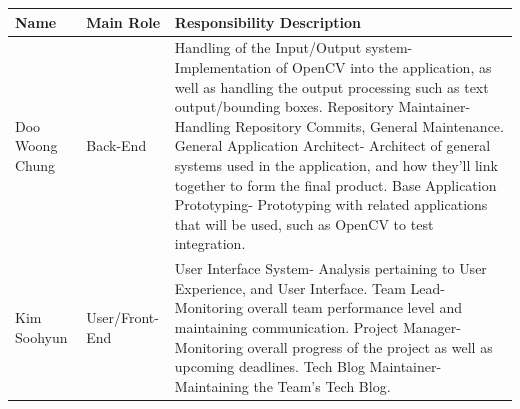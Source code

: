 \documentclass[conference]{IEEEtran}
\begin{document}
\begin{table}[htbp]
\begin{tabular}{|p{1.5cm}|p{1.5cm}|p{4.7cm}|}
\hline
\textbf{Name} & \textbf{Main Role} & \textbf{Responsibility Description}\\ \hline
Doo Woong Chung & Back-End & 
\newline Handling of the Input/Output system\newline- Implementation of OpenCV into the application, as well as handling the output processing such as text output/bounding boxes.
\newline 
\newline Repository Maintainer\newline- Handling Repository Commits, General Maintenance.
\newline 
\newline General Application Architect\newline- Architect of general systems used in the application, and how they'll link together to form the final product. 
\newline 
\newline Base Application Prototyping\newline- Prototyping with related applications that will be used, such as OpenCV to test integration. \\ \hline

Kim Soohyun & User/Front-End & 
\newline User Interface System\newline- Analysis pertaining to User Experience, and User Interface.
\newline 
\newline Team Lead\newline- Monitoring overall team performance level and maintaining communication.
\newline 
\newline Project Manager\newline- Monitoring overall progress of the project as well as upcoming deadlines.
\newline 
\newline Tech Blog Maintainer\newline- Maintaining the Team's Tech Blog.
\\ \hline


\end{tabular}
\end{table}
\end{document}
